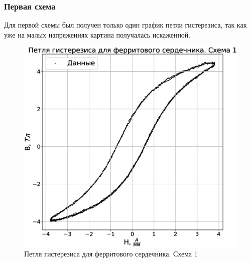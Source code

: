 \documentclass[a4paper,14pt]{extarticle}
\begin{document}
			\subsubsection{Первая схема}
				Для первой схемы был получен только один график петли гистерезиса, так как уже на малых напряжениях картина получалась искаженной. 
				\begin{figure}[h!]
					\includegraphics[width=1.0\linewidth]{Lab2_2.eps}
					\caption{Петля гистерезиса для ферритового сердечника. Схема 1}
					\label{fig5}
				\end{figure}
				\newpage
\end{document}
